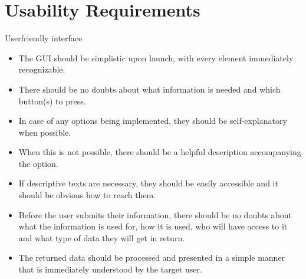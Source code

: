 


\section{Usability Requirements}
\begin{requirement}{Userfriendly interface} 
\begin{itemize}
  \item The \ac{GUI} should be simplistic upon launch, with every element
  immediately recognizable.
  \item There should be no doubts about what information is needed and which button(s) to press.
  \item In case of any options being implemented, they should be self-explanatory when possible.
  \item When this is not possible, there should be a helpful description
  accompanying the option.
  \item If descriptive texts are necessary, they should be easily accessible and
  it should be obvious how to reach them.
  \item Before the user submits their information, there should be no doubts
  about what the information is used for, how it is used, who will have access to it and what type of data they will get in return.
  \item The returned data should be processed and presented in a simple manner that is immediately understood by the
        target user.
\end{itemize}
\end{requirement}